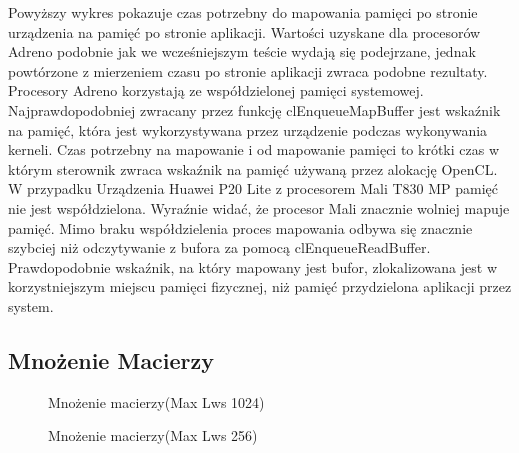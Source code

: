 Powyższy wykres pokazuje czas potrzebny do mapowania pamięci po stronie urządzenia na pamięć po stronie aplikacji. Wartości uzyskane dla procesorów Adreno podobnie jak we wcześniejszym teście wydają się podejrzane, jednak powtórzone z mierzeniem czasu po stronie aplikacji zwraca podobne rezultaty. Procesory Adreno korzystają ze współdzielonej pamięci systemowej. Najprawdopodobniej zwracany przez funkcję clEnqueueMapBuffer jest wskaźnik na pamięć, która jest wykorzystywana przez urządzenie podczas wykonywania kerneli. Czas potrzebny na mapowanie i od mapowanie pamięci to krótki czas w którym sterownik zwraca wskaźnik na pamięć używaną przez alokację OpenCL. W przypadku Urządzenia Huawei P20 Lite z procesorem Mali T830 MP pamięć nie jest współdzielona. Wyraźnie widać, że procesor Mali znacznie wolniej mapuje pamięć. Mimo braku współdzielenia proces mapowania odbywa się znacznie szybciej niż odczytywanie z bufora za pomocą clEnqueueReadBuffer. Prawdopodobnie wskaźnik, na który mapowany jest bufor, zlokalizowana jest w korzystniejszym miejscu pamięci fizycznej, niż pamięć przydzielona aplikacji przez system.

\subsection[Mnożenie Macierzy]{Mnożenie Macierzy}
\begin{figure}[H]
\caption{Mnożenie macierzy(Max Lws 1024)}
\end{figure}

\begin{figure}[H]
\caption{Mnożenie macierzy(Max Lws 256)}
\end{figure}

